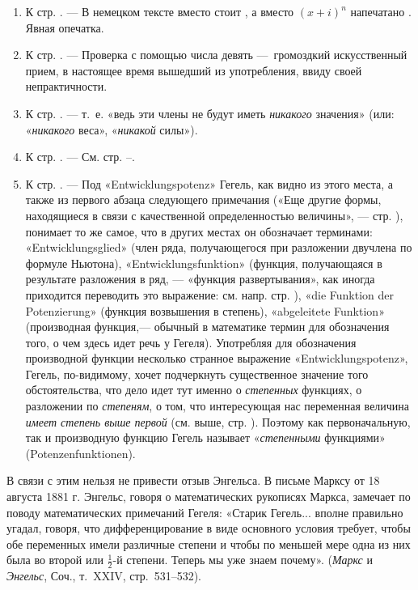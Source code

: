 \begin{enumerate}
\item \label{bkm:Ref474666121}К стр. \pageref{bkm:bm49}. — В немецком тексте
вместо  стоит , а вместо  $(x+i)^n$ напечатано . Явная опечатка.
\item \label{bkm:Ref474666136}К стр. \pageref{bkm:bm50}. — Проверка с
помощью числа девять —~громоздкий искусственный прием, в настоящее время
вышедший из употребления, ввиду своей непрактичности.
\item \label{bkm:Ref474666147}К стр. \pageref{bkm:bm51}. — т.~е. «ведь эти
члены не будут иметь {\em никакого} значения» (или: «{\em никакого}
веса», «{\em никакой} силы»).
\item \label{bkm:Ref474666169}К стр. \pageref{bkm:bm52}. — См. стр.
\pageref{bkm:bm52a}–\pageref{bkm:bm52b}.
\item \label{bkm:Ref474666189}К стр. \pageref{bkm:bm53}. — Под
«Entwicklungspotenz» Гегель, как видно из этого места, а также из первого
абзаца следующего примечания («Еще другие формы, находящиеся в связи с
качественной определенностью величины», — стр. \pageref{bkm:bm53a}),
понимает то же самое, что в других местах он обозначает терминами:
«Entwicklungsglied» (член ряда, получающегося при разложении двучлена  по
формуле Ньютона), «Entwicklungsfunktion» (функция, получающаяся в
результате разложения в ряд, — «функция развертывания», как иногда
приходится переводить это выражение: см. напр. стр. \pageref{bkm:bm53b}),
«die Funktion der Potenzierung» (функция возвышения в степень),
«abgeleitete Funktion» (производная функция,— обычный в математике термин
для обозначения того, о чем здесь идет речь у Гегеля). Употребляя для
обозначения производной функции несколько странное выражение
«Entwicklungspotenz», Гегель, по-видимому, хочет подчеркнуть существенное
значение того обстоятельства, что дело идет тут именно о {\em степенных}
функциях, о разложении по {\em степеням}, о том, что интересующая нас
переменная величина {\em имеет степень выше первой} (см. выше, стр.
\pageref{bkm:bm53c}). Поэтому как первоначальную, так и производную функцию
Гегель называет «{\em степенными} функциями» (Potenzenfunktionen).
\end{enumerate}
В связи с этим нельзя не привести отзыв Энгельса. В письме Марксу от 18
августа 1881 г. Энгельс, говоря о математических рукописях Маркса, замечает
по поводу математических примечаний Гегеля: «Старик Гегель... вполне
правильно угадал, говоря, что дифференцирование в виде основного условия
требует, чтобы обе переменных имели различные степени и чтобы по меньшей
мере одна из них была во второй или $\frac 1 2$-й степени. Теперь мы уже знаем
почему». ({\em Маркс} и {\em Энгельс}, Соч., т.~XXIV, стр.~531–532).


